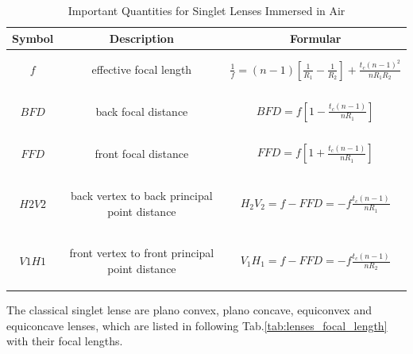 \begin{table}
\begin{tabular}{|c|c|c|}
\hline
\textbf{Symbol}&\textbf{Description}&\textbf{Formular}\\
\hline
$f$ & \parbox[c]{6cm}{
						\begin{center}
						effective focal length
						\end{center}
				}& $\frac{1}{f}=(n-1)\left[\frac{1}{R_{1}}-\frac{1}{R_{2}} \right]+\frac{t_{c}(n-1)^2}{nR_{1}R_{2}}$ \\
\hline
$BFD$ &\parbox[c]{6cm}{
						\begin{center}
						back focal distance 
						\end{center}
			}& $BFD=f\left[ 1-\frac{t_{c}(n-1)}{nR_{1}}\right]$ \\
\hline
$FFD$ &\parbox[c]{6cm}{
						\begin{center}
						 front focal distance
						 \end{center} 
			}& $FFD=f\left[ 1+\frac{t_{c}(n-1)}{nR_{1}}\right]$ \\
\hline
$H2V2$ & \parbox[c]{6cm}{
						\begin{center}
						back vertex to back principal point distance
						\end{center}						
			} & $H_{2}V_{2}=f-FFD=-f\frac{t_{c}(n-1)}{nR_{1}}$ \\
\hline
$V1H1$ & \parbox[c]{6cm}{
						\begin{center}			
				    front vertex to front principal point distance
				    \end{center}
				 } & $V_{1}H_{1}=f-FFD=-f\frac{t_{c}(n-1)}{nR_{2}}$ \\
\hline
\end{tabular}
\caption{Important Quantities for Singlet Lenses Immersed in Air}
\label{tab:lens_quantities}
\end{table}









The classical singlet lense are plano convex, plano concave, equiconvex and equiconcave lenses, which are listed in following Tab.\ref{tab:lenses_focal_length} with their focal lengths.

